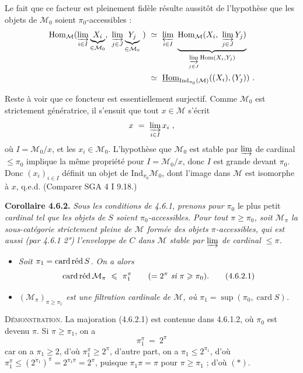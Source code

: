\documentclass[11pt]{article}
\newcommand{\printedpage}[1]{\marginpar{\footnotesize p.~#1}}
\newcommand{\msp}[1]{\marginpar{\footnotesize [#1]}}
\newcommand{\cardred}{\mathop{\mathrm{card}\,\textup{réd}}\nolimits}
\newcommand{\Ind}{\mathrm{Ind}}
\begin{document}
Le fait que ce facteur est pleinement fidèle résulte aussitôt de l'hypothèse que les objets de $\mathcal{M}_0$ soient $\pi_0$-accessibles : %
\[
\begin{aligned}
\operatorname{Hom}_{\mathcal{M}}(\varinjlim_{i\in I}\underbrace{X_i}_{\in\mathcal{M}_0},\ \varinjlim_{j\in J}\underbrace{Y_j}_{\in\mathcal{M}_0}\ ) &\ \simeq\ \varprojlim_{i\in I}\ \underbrace{\operatorname{Hom}_{\mathcal{M}}(X_i,\ \varinjlim_{j\in J}Y_j)}_{\varinjlim\limits_{j\in J}\operatorname{Hom}(X_i,Y_j)}\\
&\ \simeq\ \underline{\operatorname{Hom}}_{\Ind_{\pi_0}(\mathcal{M})}((X_i),(Y_j))\ .
\end{aligned}
\]

\msp{page 145}

Reste à voir que ce foncteur est essentiellement surjectif. Comme $\mathcal{M}_0$ est strictement génératrice, il s'ensuit que tout $x\in\mathcal{M}$ s'écrit
\[
x \ =\ \varinjlim_{i\in I}x_i\ ,
\]
où $I=\mathcal{M}_0/x$, et les $x_i\in\mathcal{M}_0$. L'hypothèse que $\mathcal{M}_0$ est stable par $\varinjlim$ de cardinal $\leqslant\pi_0$ implique la même propriété pour $I=\mathcal{M}_0/x$, donc $I$ est grande devant $\pi_0$. Donc $(x_i)_{i\in I}$ définit un objet de $\Ind_{\pi_0}\mathcal{M}_0$, dont l'image dans $\mathcal{M}$ est isomorphe à $x$, q.e.d. (Comparer SGA 4 I 9.18.)

\textbf{Corollaire 4.6.2.} \textit{Sous les conditions de 4.6.1, prenons pour $\pi_0$} le plus petit \textit{cardinal tel que les objets de $S$ soient $\pi_0$-accessibles. Pour tout $\pi\geqslant\pi_0$, soit $\mathcal{M}_\pi$ la sous-catégorie strictement pleine de $\mathcal{M}$ formée des objets $\pi$-accessibles, qui est aussi (par 4.6.1 2°) l'enveloppe de $C$ dans $\mathcal{M}$ stable par $\varinjlim$ de cardinal $\leqslant\pi$.}
\begin{itemize}[leftmargin=2.5em]
\item[\textit{1°)}] \textit{Soit $\pi_1=\cardred S$. On a alors}
\[
\cardred\mathcal{M}_\pi \ \leqslant\ \pi_1^{\pi} \qquad (=2^{\pi}\ \textit{si}\ \pi\geqslant\pi_0). \tag*{(4.6.2.1)}
\]
\printedpage{47}
\msp{page 146}
\item[\textit{2°)}] \textit{$(\mathcal{M}_\pi)_{\pi\geqslant\pi_1}$ est une filtration cardinale de $\mathcal{M}$, où $\pi_1=\sup(\pi_0,\operatorname{card}S)$.}
\end{itemize}

\textsc{Démonstration}. La majoration (4.6.2.1) est contenue dans 4.6.1.2, où $\pi_0$ est devenu $\pi$. Si $\pi\geqslant\pi_1$, on a
\[
\pi_1^{\pi} \ =\ 2^{\pi} \tag*{$(*)$}
\]
car on a $\pi_1\geqslant2$, d'où $\pi_1^{\pi}\geqslant2^{\pi}$, d'autre part, on a $\pi_1\leqslant2^{\pi_1}$, d'où $\pi_1^{\pi}\leqslant(2^{\pi_1})^{\pi}=2^{\pi_1\pi}=2^{\pi}$, puisque $\pi_1\pi=\pi$ pour $\pi\geqslant\pi_1$ ; d'où $(*)$.
\end{document}
